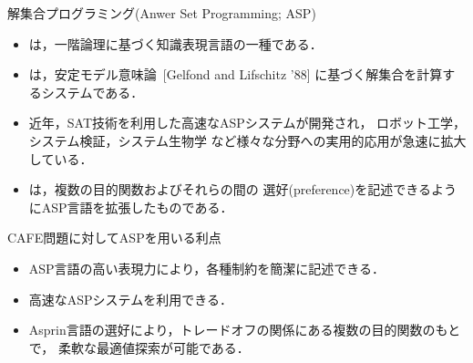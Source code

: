 \documentclass[dvipdfmx, 11pt]{beamer}
\begin{document}
\begin{frame}{解集合プログラミング(Anwer Set Programming; ASP)}
 \begin{itemize}
 \item {}は，一階論理に基づく知識表現言語の一種である．
 \item {}は，安定モデル意味論~[Gelfond and Lifschitz '88]
   に基づく解集合を計算するシステムである．
 \item 近年，SAT技術を利用した高速なASPシステムが開発され，
   ロボット工学，システム検証，システム生物学
   など様々な分野への実用的応用が急速に拡大している．
  \item {}は，複数の目的関数およびそれらの間の
	選好(preference)を記述できるようにASP言語を拡張したものである．
 \end{itemize}
\vfill
 \begin{alertblock}{CAFE問題に対してASPを用いる利点}
   \begin{itemize} 
    \item ASP言語の高い表現力により，各種制約を簡潔に記述できる．
    \item 高速なASPシステムを利用できる．
    \item Asprin言語の選好により，トレードオフの関係にある複数の目的関数のもとで，
	  柔軟な最適値探索が可能である．
   \end{itemize}
 \end{alertblock}
\end{frame}
\end{document}
